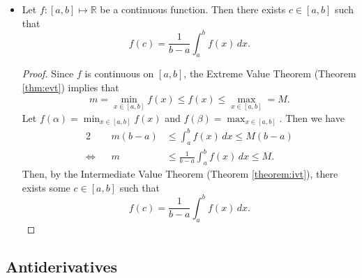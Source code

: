 \documentclass{article}
\newcommand{\R}{\mathbb{R}}
\newcommand{\?}{\stackrel{?}{=}}
\theoremstyle{definition} %
\begin{document}
\begin{itemize}
\begin{proof}
\begin{align*}
            &= \lim_{n \to \infty} \sum_{i = 1}^n \max_{x \in [x_{i - 1}, x_i]}(\lambda f)(x)(x_i - x_{i - 1}) \\
            &= \lambda \cdot \lim_{n \to \infty} \sum_{i = 1}^n \underbrace{\max_{x \in [x_{i - 1}, x_i]} f(x)}_{\overline{S}_{\sigma_n}(f)} (x_{i} - x_{i - 1}) \\
            &= \lambda \int_a^b f(x) \,dx.
        \end{align*}
    \end{proof}
    \item[]
    \begin{lemma}
        Let $f: [a, b] \mapsto \R$ be a continuous function. Then there exists $c \in [a, b]$ such that
        $$f(c) = \frac{1}{b - a} \int_a^b f(x) \,dx.$$
        \label{thm:imvt}
    \end{lemma}
    \begin{proof}
        Since $f$ is continuous on $[a, b]$, the Extreme Value Theorem (Theorem \ref{thm:evt}) implies that
        $$m = \min_{x \in [a, b]} f(x) \leq f(x) \leq \max_{x \in [a, b]} = M.$$
        Let $f(\alpha) = \min_{x \in [a, b]} f(x)$ and $f(\beta) = \max_{x \in [a, b]}$. Then we have
        \begin{alignat*}{2}
            &&m(b - a) &\leq \int_a^b f(x) \,dx \leq M(b - a) \\
            \iff&& m &\leq \frac{1}{b - a} \int_a^b f(x) \,dx \leq M .
        \end{alignat*}
        Then, by the Intermediate Value Theorem (Theorem \ref{theorem:ivt}), there exists some $c \in [a, b]$ such that
        $$f(c) = \frac{1}{b - a} \int_a^b f(x) \,dx.$$
    \end{proof}
\end{itemize}

\subsection{Antiderivatives}
\end{document}
